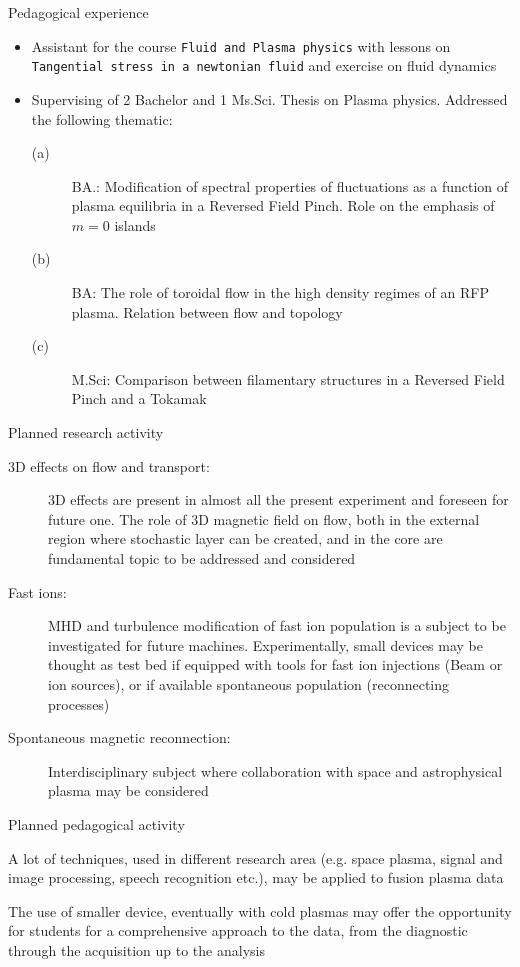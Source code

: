 \documentclass[t,10pt]{beamer}
\begin{document}
\begin{frame}{Pedagogical experience}
\begin{itemize}
\item Assistant for the course \textcolor{ta3chameleon}{\texttt{Fluid and Plasma physics} }with
  lessons on \textcolor{ta3chameleon}{\texttt{Tangential stress in a newtonian fluid}} and
  exercise on fluid dynamics
\item Supervising of 2 Bachelor and 1 Ms.Sci. Thesis on Plasma
  physics. Addressed the following thematic:
\begin{description}
\item[(a)] BA.: Modification of spectral properties of fluctuations as a
  function of plasma equilibria in a Reversed Field Pinch. Role on the
  emphasis of $m=0$ islands
\item[(b)] BA: The role of toroidal flow in the high density regimes
  of an RFP plasma. Relation between flow and topology
\item[(c)] M.Sci: Comparison between filamentary structures in a
  Reversed Field Pinch and a Tokamak
\end{description}
\end{itemize}
\end{frame}

\begin{frame}{Planned research activity}
\begin{description}
\item[3D effects on flow and transport:] 3D effects are
  present in almost all the present experiment and foreseen for future
  one. The role of 3D magnetic field on flow, both in the external
  region where stochastic layer can be created, and in the core are
  fundamental topic to be addressed and considered
\item[Fast ions:] MHD and turbulence modification of fast ion
  population is a subject to be investigated for future
  machines. Experimentally, small devices may be thought as test bed
  if equipped with tools for fast ion injections (Beam or ion
  sources), or if available spontaneous population (reconnecting processes)
\item[Spontaneous magnetic reconnection:] Interdisciplinary subject
  where collaboration with space and astrophysical plasma may be considered 
\end{description}
\end{frame}

\begin{frame}{Planned pedagogical activity}
\begin{description}
{\large \item[Multidisciplinary approach to data analysis:] A lot of
  techniques, used in different research area (e.g. space plasma,
  signal and image processing, speech recognition etc.), may be applied to
  fusion plasma data}
{\large\item[Small fusion device as learning tools:] The use of smaller
  device, eventually with cold plasmas may offer the opportunity
  for students for a comprehensive approach to the data, from the
  diagnostic through the acquisition up to the analysis }
\end{description}
\end{frame}
\end{document}
